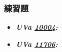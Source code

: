 \subsubsection*{練習題}
\begin{itemize}[label={\Checkmark}]
\item \textbf{\textit{UVa \href{http://uva.onlinejudge.org/external/100/10004.html}{10004}: }}\\

\item \textbf{\textit{UVa \href{http://uva.onlinejudge.org/external/117/11706.html}{11706}: }}\\

\end{itemize}